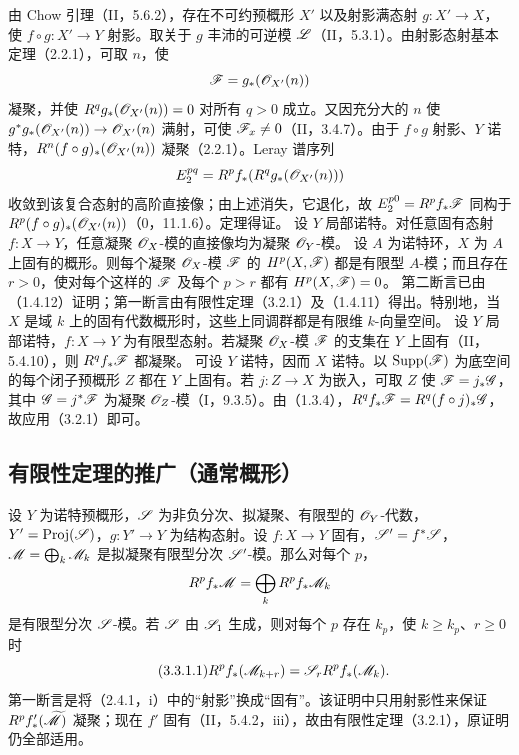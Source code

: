由 Chow 引理（II，5.6.2），存在不可约预概形 $X'$ 以及射影满态射 $g:X'\to X$，使 $f\circ g:X'\to Y$ 射影。取关于 $g$ 丰沛的可逆模 $\mathscr L$（II，5.3.1）。由射影态射基本定理（2.2.1），可取 $n$，使
\[
\mathscr F=g_*(\mathscr O_{X'}(n))
\]
凝聚，并使 $R^qg_*(\mathscr O_{X'}(n))=0$ 对所有 $q>0$ 成立。又因充分大的 $n$ 使 $g^*g_*(\mathscr O_{X'}(n))\to\mathscr O_{X'}(n)$ 满射，可使 $\mathscr F_x\ne0$（II，3.4.7）。由于 $f\circ g$ 射影、$Y$ 诺特，$R^n(f\circ g)_*(\mathscr O_{X'}(n))$ 凝聚（2.2.1）。Leray 谱序列
\[
E_2^{pq}=R^pf_*(R^qg_*(\mathscr O_{X'}(n)))
\]
收敛到该复合态射的高阶直接像；由上述消失，它退化，故 $E_2^{p0}=R^pf_*\mathscr F$ 同构于 $R^p(f\circ g)_*(\mathscr O_{X'}(n))$（0，11.1.6）。定理得证。\finishproof
{}
设 $Y$ 局部诺特。对任意固有态射 $f:X\to Y$，任意凝聚 $\mathscr O_X$-模的直接像均为凝聚 $\mathscr O_Y$-模。
设 $A$ 为诺特环，$X$ 为 $A$ 上固有的概形。则每个凝聚 $\mathscr O_X$-模 $\mathscr F$ 的 $H^p(X,\mathscr F)$ 都是有限型 $A$-模；而且存在 $r>0$，使对每个这样的 $\mathscr F$ 及每个 $p>r$ 都有 $H^p(X,\mathscr F)=0$。
\eproof
第二断言已由（1.4.12）证明；第一断言由有限性定理（3.2.1）及（1.4.11）得出。特别地，当 $X$ 是域 $k$ 上的固有代数概形时，这些上同调群都是有限维 $k$-向量空间。\finishproof
{}
设 $Y$ 局部诺特，$f:X\to Y$ 为有限型态射。若凝聚 $\mathscr O_X$-模 $\mathscr F$ 的支集在 $Y$ 上固有（II，5.4.10），则 $R^qf_*\mathscr F$ 都凝聚。
\eproof
可设 $Y$ 诺特，因而 $X$ 诺特。以 $\operatorname{Supp}(\mathscr F)$ 为底空间的每个闭子预概形 $Z$ 都在 $Y$ 上固有。若 $j:Z\to X$ 为嵌入，可取 $Z$ 使 $\mathscr F=j_*\mathscr G$，其中 $\mathscr G=j^*\mathscr F$ 为凝聚 $\mathscr O_Z$-模（I，9.3.5）。由（1.3.4），$R^qf_*\mathscr F=R^q(f\circ j)_*\mathscr G$，故应用（3.2.1）即可。\finishproof

\subsection{有限性定理的推广（通常概形）}
设 $Y$ 为诺特预概形，$\mathscr S$ 为非负分次、拟凝聚、有限型的 $\mathscr O_Y$-代数，$Y'=\operatorname{Proj}(\mathscr S)$，$g:Y'\to Y$ 为结构态射。设 $f:X\to Y$ 固有，$\mathscr S'=f^*\mathscr S$，$\mathscr M=\bigoplus_k\mathscr M_k$ 是拟凝聚有限型分次 $\mathscr S'$-模。那么对每个 $p$，
\[
R^pf_*\mathscr M=\bigoplus_kR^pf_*\mathscr M_k
\]
是有限型分次 $\mathscr S$-模。若 $\mathscr S$ 由 $\mathscr S_1$ 生成，则对每个 $p$ 存在 $k_p$，使 $k\ge k_p$、$r\ge0$ 时
\begin{equation}\tag{3.3.1.1}
R^pf_*(\mathscr M_{k+r})=\mathscr S_rR^pf_*(\mathscr M_k).
\end{equation}
\eproof
第一断言是将（2.4.1，i）中的“射影”换成“固有”。该证明中只用射影性来保证 $R^pf'_*(\widetilde{\mathscr M})$ 凝聚；现在 $f'$ 固有（II，5.4.2，iii），故由有限性定理（3.2.1），原证明仍全部适用。

